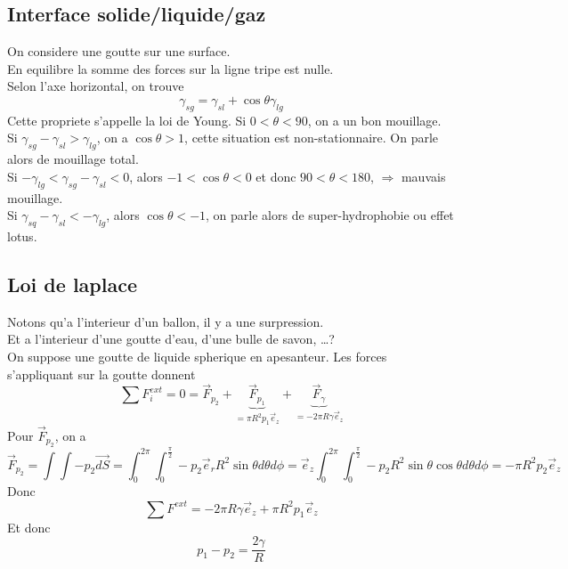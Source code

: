 \documentclass[../main.tex]{subfiles}
\begin{document}
\subsection{Interface solide/liquide/gaz}
On considere une goutte sur une surface.\\
En equilibre la somme des forces sur la ligne tripe est nulle.\\
Selon l'axe horizontal, on trouve
\[ 
\gamma_{sg} = \gamma_{sl} + \cos\theta \gamma_{lg} 
\]
Cette propriete s'appelle la loi de Young.
Si $0<\theta < 90$, on a un bon mouillage.\\
Si $\gamma_{sg} -\gamma_{sl} >\gamma_{lg}$, on a $\cos \theta >1$, cette situation est non-stationnaire.
On parle alors de mouillage total.\\
Si $-\gamma_{lg} < \gamma_{sg} -\gamma_{sl} <0$, alors $-1< \cos\theta <0$ et donc $90<\theta <180$, $\Rightarrow$ mauvais mouillage.\\
Si $\gamma_{sq} - \gamma_{sl} < -\gamma_{lg} $, alors $\cos \theta <-1$, on parle alors de super-hydrophobie ou effet lotus.
\subsection{Loi de laplace}
Notons qu'a l'interieur d'un ballon, il y a une surpression.\\
Et a l'interieur d'une goutte d'eau, d'une bulle de savon, \ldots ?\\
On suppose une goutte de liquide spherique en apesanteur.
Les forces s'appliquant sur la goutte donnent
\[ 
\sum F_i^{ext}= 0 = \vec{F}_{p_2} + \underbrace{\vec{F}_{p_1}}_{= \pi R^{2}p_1 \vec{e}_z} + \underbrace{\vec{F}_{\gamma}}_{=-2\pi R \gamma \vec{e}_z} 
\]
Pour $\vec{F}_{p_2} $, on a 
\[
	\vec{F}_{p_2} = \int \int - p_2 \vec{dS} = \int_{ 0 }^{ 2\pi } \int_{ 0 }^{ \frac{\pi}{2} }- p_2 \vec{e}_r R^{2} \sin\theta d \theta d\phi = \vec{e}_z \int_{ 0 }^{ 2\pi } \int_{ 0 }^{ \frac{\pi}{2} }- p_2 R^{2} \sin \theta \cos \theta d\theta d \phi = - \pi R^{2}p_{2} \vec{e}_z
\]
Donc
\[ 
	\sum F^{ext}= - 2 \pi R \gamma \vec{e}_z + \pi R^{2}p_1 \vec{e}_z
\]
Et donc
\[ 
p_1 - p_2 = \frac{2\gamma}{R}
\]
\end{document}
